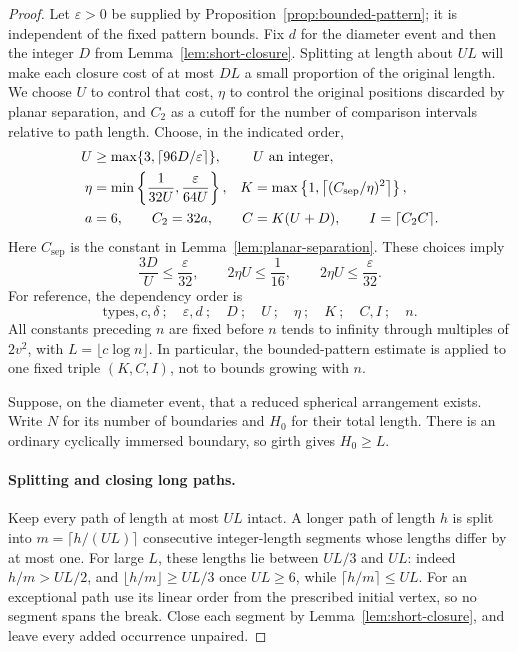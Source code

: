 \begin{proof}
Let $\varepsilon>0$ be supplied by
Proposition~\ref{prop:bounded-pattern}; it is independent of the fixed
pattern bounds.  Fix $d$ for the diameter event and then the integer $D$
from Lemma~\ref{lem:short-closure}.
Splitting at length about $UL$ will make each closure cost of at most
$DL$ a small proportion of the original length.  We choose $U$ to
control that cost, $\eta$ to control the original positions discarded
by planar separation, and $C_2$ as a cutoff for the number of comparison
intervals relative to path length.  Choose, in the indicated order,
\begin{align}
 U&\ge\max\{3,\lceil96D/\varepsilon\rceil\},
       &&\text{$U$ an integer}, \notag\\
 \eta&=\min\left\{\frac1{32U},\frac{\varepsilon}{64U}\right\},
 &K&=\max\left\{1,\left\lceil(C_{\mathrm{sep}}/\eta)^2\right\rceil\right\},
 \label{eq:planar-parameters}\\
 a&=6,\qquad C_2=32a,
 &C&=K(U+D),\qquad I=\lceil C_2C\rceil. \notag
\end{align}
Here $C_{\mathrm{sep}}$ is the constant in Lemma~\ref{lem:planar-separation}.
These choices imply
\begin{equation}
 \frac{3D}{U}\le\frac{\varepsilon}{32},\qquad
 2\eta U\le\frac1{16},\qquad
 2\eta U\le\frac{\varepsilon}{32}.
 \label{eq:planar-loss-choices}
\end{equation}
For reference, the dependency order is
\begin{equation}\label{eq:parameter-order}
 \text{types},c,\delta\ ;\quad
 \varepsilon,d\ ;\quad D\ ;\quad U\ ;\quad\eta\ ;\quad K\ ;\quad C,I\ ;\quad n.
\end{equation}
All constants preceding $n$ are fixed before $n$ tends to infinity
through multiples of $2v^2$, with $L=\lfloor c\log n\rfloor$.
In particular, the bounded-pattern estimate is applied to one fixed
triple $(K,C,I)$, not to bounds growing with $n$.

Suppose, on the diameter event, that a reduced spherical arrangement
exists.  Write $N$ for its number of boundaries and $H_0$ for their
total length.  There is an ordinary cyclically immersed boundary, so
girth gives $H_0\ge L$.

\paragraph{Splitting and closing long paths.}
Keep every path of length at most $UL$ intact.  A longer path of length
$h$ is split into
$m=\lceil h/(UL)\rceil$ consecutive integer-length segments whose
lengths differ by at most one.  For large $L$, these lengths lie
between $UL/3$ and $UL$: indeed $h/m>UL/2$, and
$\lfloor h/m\rfloor\ge UL/3$ once $UL\ge6$, while
$\lceil h/m\rceil\le UL$.  For an exceptional path use its linear
order from the prescribed initial vertex, so no segment spans the
break.  Close each segment by Lemma~\ref{lem:short-closure}, and leave
every added occurrence unpaired.


\end{proof}
